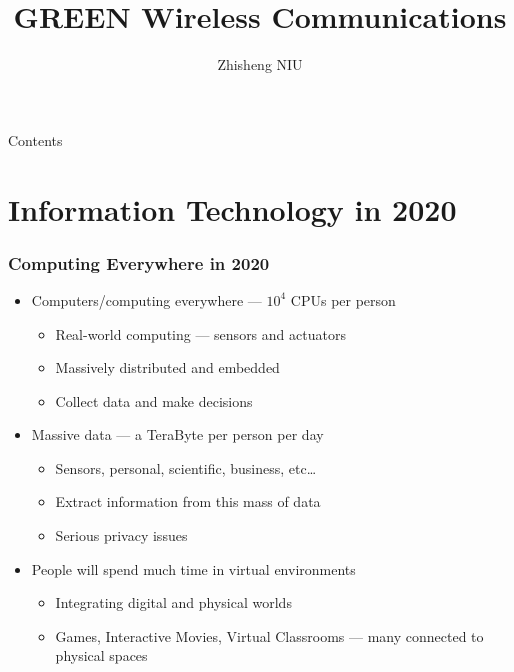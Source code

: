 \documentclass[usepdftitle=false]{beamer}
\title
{\textcolor{green!50!black}{GREEN} \alert{Wireless Communications}}
\author[short] %
{Zhisheng NIU}
\institute[short] %
{
\niulab\\
Tsinghua University, Beijing, China
}
\date{}
\begin{document}
{
\begin{frame}
\titlepage
\end{frame}
}

\begin{frame}{Contents}
\tableofcontents
\end{frame}




\section{Information Technology in 2020}

\begin{frame}
  \frametitle{Computing Everywhere in 2020}
  \begin{itemize}
    \item Computers/computing everywhere --- $10^4$ CPUs per person
      \begin{itemize}
        \item Real-world computing --- sensors and actuators
        \item Massively distributed and embedded
        \item Collect data and make decisions
      \end{itemize}
    \item Massive data --- a TeraByte per person per day
      \begin{itemize}
        \item Sensors, personal, scientific, business, etc\ldots
        \item Extract information from this mass of data
        \item Serious privacy issues
      \end{itemize}
    \item People will spend much time in virtual environments
      \begin{itemize}
        \item Integrating digital and physical worlds
        \item Games, Interactive Movies, Virtual Classrooms --- many connected
        to physical spaces
      \end{itemize}
  \end{itemize}
\end{frame}
\end{document}
